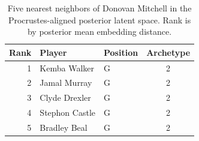 \begin{table}[htbp]
  \centering\small
  \begin{tabular}{rllc}
    \toprule
    Rank & Player & Position & Archetype \\
    \midrule
    1 & Kemba Walker & G & 2 \\
    2 & Jamal Murray & G & 2 \\
    3 & Clyde Drexler & G & 2 \\
    4 & Stephon Castle & G & 2 \\
    5 & Bradley Beal & G & 2 \\
    \bottomrule
  \end{tabular}
  \caption{Five nearest neighbors of Donovan Mitchell in the Procrustes-aligned posterior latent space. Rank is by posterior mean embedding distance.}
  \label{tab:Donovan_Mitchell_neighbors}
\end{table}

